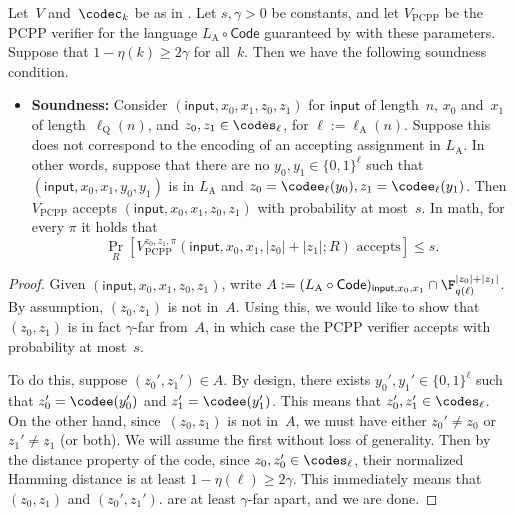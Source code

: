 \begin{proposition}\label{prop:new-soundness}
Let~$V$ and~$\codec_k$ be as in .
Let $s, \gamma > 0$ be constants,
and let $V_{\mathrm{PCPP}}$ be the PCPP verifier for the language $L_{\mathrm{A}} \circ \mathsf{Code}$
guaranteed by  with these parameters.
Suppose that $1-\eta(k) \geq 2\gamma$ for all~$k$.
Then we have the following soundness condition.
\begin{itemize}
\item[$\circ$] \textbf{Soundness:} Consider $(\mathsf{input}, x_0, x_1, z_0, z_1)$ for $\mathsf{input}$ of length~$n$, $x_0$ and~$x_1$ of length~$\ell_{\mathrm{Q}}(n)$,
	and $z_0, z_1 \in \codes_{\ell}$, for $\ell := \ell_{\mathrm{A}}(n)$.
	Suppose this does not correspond to the encoding of an accepting assignment in $L_{\mathrm{A}}$.
	In other words, suppose that there are no $y_0, y_1 \in \{0, 1\}^\ell$ such that $(\mathsf{input}, x_0, x_1, y_0, y_1)$ is in $L_{\mathrm{A}}$
	and $z_0 = \codee_{\ell}(y_0), z_1 = \codee_{\ell}(y_1)$.
	Then $V_{\mathrm{PCPP}}$ accepts $(\mathsf{input}, x_0, x_1, z_0, z_1)$ with probability at most~$s$.
	In math, for every $\pi$ it holds that
	\begin{equation*}
		\Pr_R[\text{$V_{\mathrm{PCPP}}^{z_0, z_1, \pi}(\mathsf{input}, x_0, x_1, |z_0| + |z_1|; R)$ accepts}] \leq s.
	\end{equation*}
\end{itemize}
\end{proposition}
\begin{proof}
Given $(\mathsf{input}, x_0, x_1, z_0, z_1)$, write $A:= (L_{\mathrm{A}} \circ \mathsf{Code})_{\mathsf{input}, x_0, x_1} \cap \F_{q(\ell)}^{|z_0| + |z_1|}$.
By assumption, $(z_0, z_1)$ is not in~$A$.
Using this, we would like to show that $(z_0, z_1)$ is in fact $\gamma$-far from~$A$, in which case the PCPP verifier accepts with probability at most~$s$.

To do this, suppose $(z_0', z_1') \in A$.
By design, there exists $y_0', y_1' \in \{0, 1\}^\ell$ such that $z_0' = \codee(y_0')$ and $z_1' = \codee(y_1')$.
This means that $z_0', z_1' \in \codes_{\ell}$.
On the other hand, since~$(z_0, z_1)$ is not in~$A$, we must have either $z_0' \neq z_0$ or $z_1' \neq z_1$ (or both).
We will assume the first without loss of generality.
Then by the distance property of the code, since $z_0, z_0' \in \codes_{\ell}$,
their normalized Hamming distance is at least $1-\eta(\ell) \geq 2\gamma$.
This immediately means that $(z_0,z_1)$ and $(z_0', z_1')$.
are at least $\gamma$-far apart, and we are done.
\end{proof}


